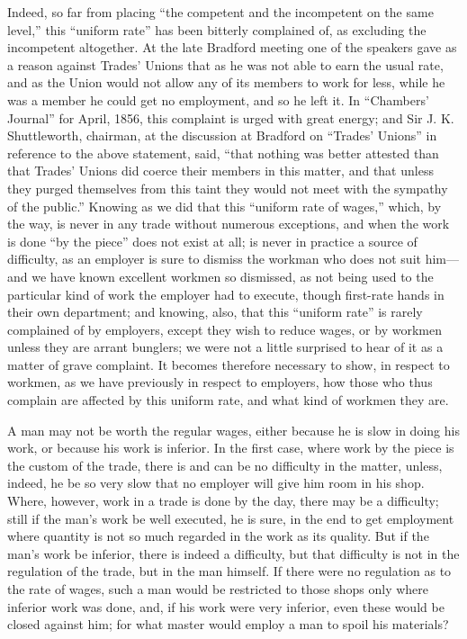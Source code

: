 Indeed, so far from placing ``the competent and the incompetent on the
same level,'' this ``uniform rate'' has been bitterly complained of, as
excluding the incompetent altogether. At the late Bradford meeting one
of the speakers gave as a reason against Trades' Unions that as he was
not able to earn the usual rate, and as the Union would not allow any of
its members to work for less, while he was a member he could get no
employment, and so he left it. In ``Chambers' Journal'' for April, 1856,
this complaint is urged with great energy; and Sir J. K. Shuttleworth,
chairman, at the discussion at Bradford on ``Trades' Unions'' in
reference to the above statement, said, ``that nothing was better
attested than that Trades' Unions did coerce their members in this
matter, and that unless they purged themselves from this taint they
would not meet with the sympathy of the public.'' Knowing as we did that
this ``uniform rate of wages,'' which, by the way, is never in any trade
without numerous exceptions, and when the work is done ``by the piece''
does not exist at all; is never in practice a source of difficulty, as
an employer is sure to dismiss the workman who does not suit him---and
we have known excellent workmen so dismissed, as not being used to the
particular kind of work the employer had to execute, though first-rate
hands in their own department; and knowing, also, that this ``uniform
rate'' is rarely complained of by employers, except they wish to reduce
wages, or by workmen unless they are arrant bunglers; we were not a
little surprised to hear of it as a matter of grave complaint. It
becomes therefore necessary to show, in respect to workmen, as we have
previously in respect to employers, how those who thus complain are
affected by this uniform rate, and what kind of workmen they are.

A man may not be worth the regular wages, either because he is slow in
doing his work, or because his work is inferior. In the first case,
where work by the piece is the custom of the trade, there is and can be
no difficulty in the matter, unless, indeed, he be so very slow that no
employer will give him room in his shop. Where, however, work in a trade
is done by the day, there may be a difficulty; still if the man's work
be well executed, he is sure, in the end to get employment where
quantity is not so much regarded in the work as its quality. But if the
man's work be inferior, there is indeed a difficulty, but that
difficulty is not in the regulation of the trade, but in the man
himself. If there were no regulation as to the rate of wages, such a man
would be restricted to those shops only where inferior work was done,
and, if his work were very inferior, even these would be closed against
him; for what master would employ a man to spoil his materials?

